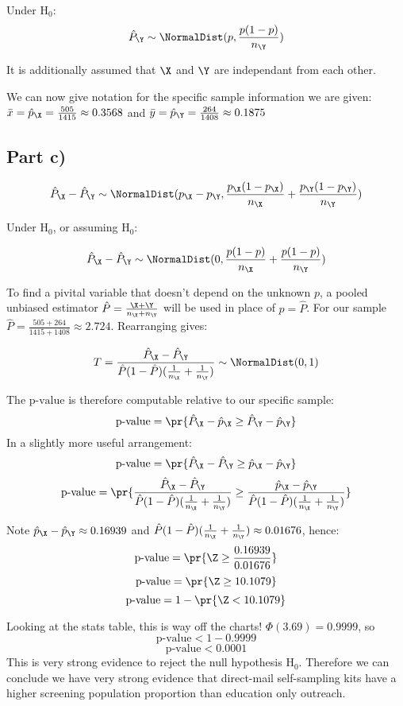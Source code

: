 Under $\text{H}_0$:
\[
\hat{P}_\Y \sim \NormalDist (p, \frac{p (1 - p)}{n_\Y})
\]

It is additionally assumed that $\X$ and $\Y$ are independant from each other.

We can now give notation for the specific sample information we are given:
$\bar{x} = \hat{p}_\X = \frac{505}{1415} \approx 0.3568$ and $\bar{y} = \hat{p}_\Y = \frac{264}{1408} \approx 0.1875$

\subsection{Part c)}

\[
\hat{P}_\X - \hat{P}_\Y \sim \NormalDist (p_\X - p_\Y, \frac{p_\X(1-p_\X)}{n_\X} + \frac{p_\Y(1-p_\Y)}{n_\Y})
\]

Under $\text{H}_0$, or assuming $\text{H}_0$:

\[
\hat{P}_\X - \hat{P}_\Y \sim \NormalDist (0, \frac{p(1-p)}{n_\X} + \frac{p(1-p)}{n_\Y})
\]

To find a pivital variable that doesn't depend on the unknown $p$, a pooled unbiased estimator $\hat{P} = \frac{\X + \Y}{n_\X + n_\Y}$
will be used in place of $p = \hat{P}$. For our sample $\hat{P} = \frac{505 + 264}{1415 + 1408} \approx 2.724$. Rearranging gives:

\[
T = \frac{\hat{P}_\X - \hat{P}_\Y}{\hat{P}(1 - \hat{P})(\frac{1}{n_\X} + \frac{1}{n_\Y})} \sim \NormalDist(0, 1)
\]

The $\text{p-value}$ is therefore computable relative to our specific sample:
\[
\text{p-value} = \pr{\hat{P}_\X - \hat{p}_\X \geq \hat{P}_\Y - \hat{p}_\Y}
\]
In a slightly more useful arrangement:
\[
\text{p-value} = \pr{\hat{P}_\X - \hat{P}_\Y \geq \hat{p}_\X - \hat{p}_\Y}
\]
\[
\text{p-value} = \pr{
	\frac{\hat{P}_\X - \hat{P}_\Y}{\hat{P}(1 - \hat{P})(\frac{1}{n_\X} + \frac{1}{n_\Y})}
	\geq
	\frac{\hat{p}_\X - \hat{p}_\Y}{\hat{P}(1 - \hat{P})(\frac{1}{n_\X} + \frac{1}{n_\Y})}
}
\]

Note $\hat{p}_\X - \hat{p}_\Y \approx 0.16939$ and $\hat{P}(1 - \hat{P})(\frac{1}{n_\X} + \frac{1}{n_\Y}) \approx 0.01676$, hence:
\[
\text{p-value} = \pr{ \Z \geq \frac{0.16939}{0.01676}}
\]
\[
\text{p-value} = \pr{ \Z \geq 10.1079}
\]
\[
\text{p-value} = 1 - \pr{ \Z < 10.1079}
\]

Looking at the stats table, this is way off the charts! $\Phi(3.69) = 0.9999$, so
\[
\text{p-value} < 1 - 0.9999
\]
\[
\text{p-value} < 0.0001
\]
This is very strong evidence to reject the null hypothesis $\text{H}_0$.
Therefore we can conclude we have very strong evidence that direct-mail self-sampling kits have a higher screening population proportion than
education only outreach.

